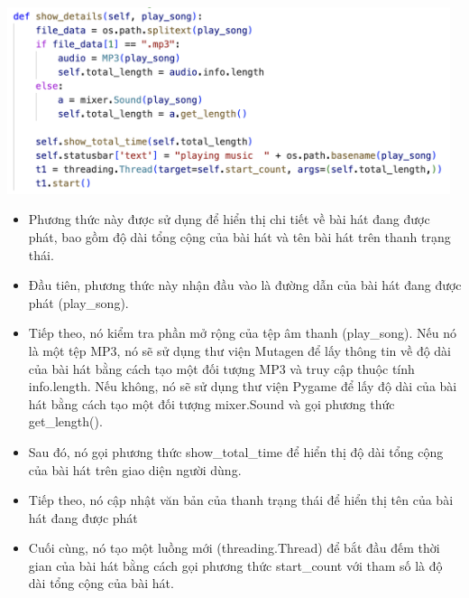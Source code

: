 \documentclass[a4paper]{article}
\begin{document}
\begin{center}
\includegraphics[width=130mm]{template_SGU 2/audio_showdetail.png}
\end{center}
\begin{itemize}
    \item Phương thức này được sử dụng để hiển thị chi tiết về bài hát đang được phát, bao gồm độ dài tổng cộng của bài hát và tên bài hát trên thanh trạng thái.
    \item Đầu tiên, phương thức này nhận đầu vào là đường dẫn của bài hát đang được phát (play\_song).
    \item Tiếp theo, nó kiểm tra phần mở rộng của tệp âm thanh (play\_song). Nếu nó là một tệp MP3, nó sẽ sử dụng thư viện Mutagen để lấy thông tin về độ dài của bài hát bằng cách tạo một đối tượng MP3 và truy cập thuộc tính info.length. Nếu không, nó sẽ sử dụng thư viện Pygame để lấy độ dài của bài hát bằng cách tạo một đối tượng mixer.Sound và gọi phương thức get\_length().
    \item Sau đó, nó gọi phương thức show\_total\_time để hiển thị độ dài tổng cộng của bài hát trên giao diện người dùng.
    \item Tiếp theo, nó cập nhật văn bản của thanh trạng thái để hiển thị tên của bài hát đang được phát
    \item Cuối cùng, nó tạo một luồng mới (threading.Thread) để bắt đầu đếm thời gian của bài hát bằng cách gọi phương thức start\_count với tham số là độ dài tổng cộng của bài hát.
\end{itemize}
\end{document}
